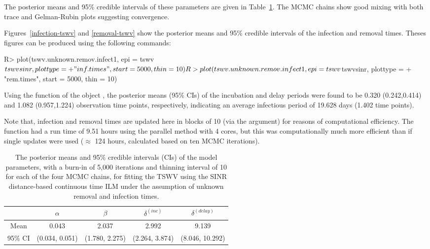 \documentclass[nojss,shortnames]{jss}
\begin{document}
The posterior means and 95\% credible intervals of these parameters are given in Table~\ref{unknown-tswv-table}. The MCMC chains show good mixing with both trace and Gelman-Rubin plots suggesting convergence. 

Figures~\ref{infection-tswv} and \ref{removal-tswv} show the posterior means and 95\% credible intervals of the infection and removal times. Theses figures can be produced using the following commands:
\begin{Sinput}
R> plot(tswv.unknown.remov.infect1, epi = tswv$tswvsinr, plottype = 
+    "inf.times", start = 5000, thin = 10)
R> plot(tswv.unknown.remov.infect1, epi = tswv$tswvsinr, plottype = 
+    "rem.times", start = 5000, thin = 10)
\end{Sinput}


Using the  function of the object , the posterior means (95\% CIs) of the incubation and delay periods were found to be 0.320 (0.242,0.414) and 1.082 (0.957,1.224) observation time points, respectively, indicating an average infectious period of 19.628 days (1.402 time points). 


Note that, infection and removal times are updated here in blocks of 10 (via the  argument) for reasons of computational efficiency.
The  function had a run time of 9.51 hours using the parallel method with 4 cores, but this was computationally much more efficient than if single updates were used ($\approx$ 124 hours, calculated based on ten MCMC iterations).

\begin{table}[!h]
\begin{center} 
\begin{tabular}{c|cccc}
\hline
		&$\alpha$		&$\beta$&	$\delta^{(inc)}$ & $\delta^{(delay)}$	\\	
\hline		
Mean	&	0.043	&	2.037	&	2.992 	&	9.139 	\\
95\% CI 	&	(0.034, 0.051)	&	(1.780, 2.275)	&	(2.264, 3.874)	&	(8.046, 10.292)	\\
\hline		

\end{tabular}
\end{center}
\caption{The posterior means and 95\% credible intervals (CIs) of the model parameters, with a burn-in of 5,000 iterations and thinning interval of 10 for each of the four MCMC chains, for fitting the TSWV using the SINR distance-based continuous time ILM under the assumption of unknown removal and infection times.}
\label{unknown-tswv-table}
\end{table}%
 
\end{document}
